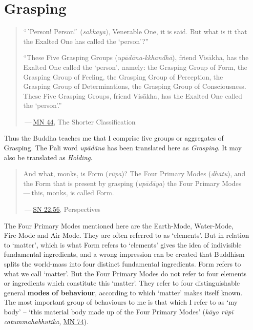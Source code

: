 \chapter{Grasping}

\begin{quote}
``\,'Person! Person!' (\emph{sakkāya}), Venerable One, it is said. But what is it that the Exalted One has called the `person'?''

``These Five Grasping Groups (\emph{upādāna-kkhandhā}), friend Visākha, has the Exalted One called the `person', namely: the Grasping Group of Form, the Grasping Group of Feeling, the Grasping Group of Perception, the Grasping Group of Determinations, the Grasping Group of Consciousness. These Five Grasping Groups, friend Visākha, has the Exalted One called the `person'.''

 --- \href{https://suttacentral.net/mn44/en/sujato}{MN 44}, The Shorter Classification
\end{quote}

Thus the Buddha teaches me that I comprise five groups or aggregates of Grasping. The Pali word \emph{upādāna} has been translated here as \emph{Grasping}. It may also be translated as \emph{Holding}.

\begin{quote}
And what, monks, is Form (\emph{rūpa})? The Four Primary Modes (\emph{dhātu}), and the Form that is present by grasping (\emph{upādāya}) the Four Primary Modes --- this, monks, is called Form.

 --- \href{https://suttacentral.net/sn22.56/en/bodhi}{SN 22.56}, Perspectives
\end{quote}

The Four Primary Modes mentioned here are the Earth-Mode, Water-Mode, Fire-Mode and Air-Mode. They are often referred to as `elements'. But in relation to `matter', which is what Form refers to `elements' gives the idea of indivisible fundamental ingredients, and a wrong impression can be created that Buddhism splits the world-mass into four distinct fundamental ingredients. Form refers to what we call `matter'. But the Four Primary Modes do not refer to four elements or ingredients which constitute this `matter'. They refer to four distinguishable general \textbf{modes of behaviour}, according to which `matter' makes itself known. The most important group of behaviours to me is that which I refer to as `my body' -- `this material body made up of the Four Primary Modes' (\emph{kāyo rūpī catummahābhūtiko}, \href{https://suttacentral.net/mn74/en/sujato}{MN 74}).

